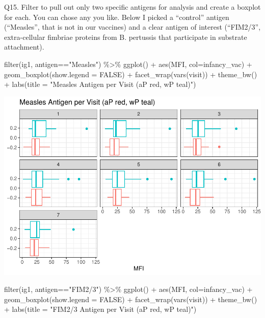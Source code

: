 \documentclass[
]{article}
\newenvironment{Shaded}{\begin{snugshade}}{\end{snugshade}}
\newcommand{\AttributeTok}[1]{\textcolor[rgb]{0.77,0.63,0.00}{#1}}
\newcommand{\ConstantTok}[1]{\textcolor[rgb]{0.00,0.00,0.00}{#1}}
\newcommand{\FunctionTok}[1]{\textcolor[rgb]{0.00,0.00,0.00}{#1}}
\newcommand{\NormalTok}[1]{#1}
\newcommand{\SpecialCharTok}[1]{\textcolor[rgb]{0.00,0.00,0.00}{#1}}
\newcommand{\StringTok}[1]{\textcolor[rgb]{0.31,0.60,0.02}{#1}}
\begin{document}
Q15. Filter to pull out only two specific antigens for analysis and
create a boxplot for each. You can chose any you like. Below I picked a
``control'' antigen (``Measles'', that is not in our vaccines) and a
clear antigen of interest (``FIM2/3'', extra-cellular fimbriae proteins
from B. pertussis that participate in substrate attachment).

\begin{Shaded}
\begin{Highlighting}[]
\FunctionTok{filter}\NormalTok{(ig1, antigen}\SpecialCharTok{==}\StringTok{"Measles"}\NormalTok{) }\SpecialCharTok{\%\textgreater{}\%}
  \FunctionTok{ggplot}\NormalTok{() }\SpecialCharTok{+}
  \FunctionTok{aes}\NormalTok{(MFI, }\AttributeTok{col=}\NormalTok{infancy\_vac) }\SpecialCharTok{+}
    \FunctionTok{geom\_boxplot}\NormalTok{(}\AttributeTok{show.legend =} \ConstantTok{FALSE}\NormalTok{) }\SpecialCharTok{+}
  \FunctionTok{facet\_wrap}\NormalTok{(}\FunctionTok{vars}\NormalTok{(visit)) }\SpecialCharTok{+}
  \FunctionTok{theme\_bw}\NormalTok{() }\SpecialCharTok{+}
  \FunctionTok{labs}\NormalTok{(}\AttributeTok{title =} \StringTok{"Measles Antigen per Visit (aP red, wP teal)"}\NormalTok{)}
\end{Highlighting}
\end{Shaded}

\includegraphics{lab-19-143_files/figure-latex/unnamed-chunk-26-1.pdf}

\begin{Shaded}
\begin{Highlighting}[]
\FunctionTok{filter}\NormalTok{(ig1, antigen}\SpecialCharTok{==}\StringTok{"FIM2/3"}\NormalTok{) }\SpecialCharTok{\%\textgreater{}\%}
  \FunctionTok{ggplot}\NormalTok{() }\SpecialCharTok{+}
  \FunctionTok{aes}\NormalTok{(MFI, }\AttributeTok{col=}\NormalTok{infancy\_vac) }\SpecialCharTok{+}
    \FunctionTok{geom\_boxplot}\NormalTok{(}\AttributeTok{show.legend =} \ConstantTok{FALSE}\NormalTok{) }\SpecialCharTok{+}
  \FunctionTok{facet\_wrap}\NormalTok{(}\FunctionTok{vars}\NormalTok{(visit)) }\SpecialCharTok{+}
  \FunctionTok{theme\_bw}\NormalTok{() }\SpecialCharTok{+}
  \FunctionTok{labs}\NormalTok{(}\AttributeTok{title =} \StringTok{"FIM2/3 Antigen per Visit (aP red, wP teal)"}\NormalTok{)}
\end{Highlighting}
\end{Shaded}
\end{document}
